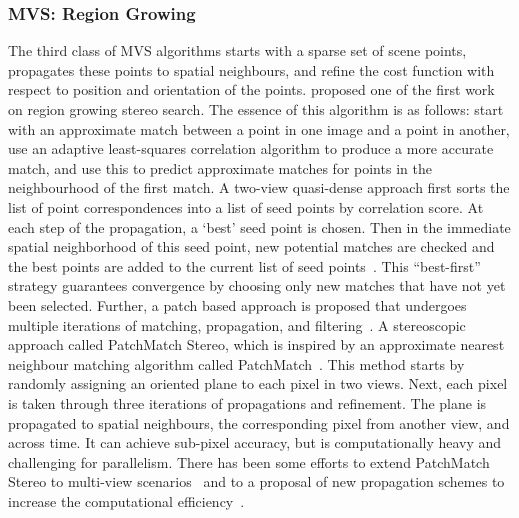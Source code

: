 \subsubsection{MVS: Region Growing}
The third class of MVS algorithms starts with a sparse set of scene points, propagates these points to spatial neighbours, and refine the cost function with respect to position and orientation of the points. \citeauthor{otto1989region} proposed one of the first work on region growing stereo search. The essence of this algorithm is as follows: start with an approximate match between a point in one image and a point in another, use an adaptive least-squares correlation algorithm to produce a more accurate match, and use this to predict approximate matches for points in the neighbourhood of the first match. A two-view quasi-dense approach first sorts the list of point correspondences into a list of seed points by correlation score. At each step of the propagation, a `best' seed point is chosen. Then in the immediate spatial neighborhood of this seed point, new potential matches are checked and the best points are added to the current list of seed points~\cite{lhuillier2002match,lhuillier2005quasi}. This ``best-first'' strategy guarantees convergence by choosing only new matches that have not yet been selected. Further, a patch based approach is proposed that undergoes multiple iterations of matching, propagation, and filtering~\cite{furukawa2010accurate}. A stereoscopic approach called PatchMatch Stereo, which is inspired by an approximate nearest neighbour matching algorithm called PatchMatch~\cite{Barnes:2009:PAR}. This method starts by randomly assigning an oriented plane to each pixel in two views. Next, each pixel is taken through three iterations of propagations and refinement. The plane is propagated to spatial neighbours, the corresponding pixel from another view, and across time. It can achieve sub-pixel accuracy, but is computationally heavy and challenging for parallelism. There has been some efforts to extend PatchMatch Stereo to multi-view scenarios~\cite{galliani2015massively,uh2014efficient,zheng2014patchmatch} and to a proposal of new propagation schemes to increase the computational efficiency~\cite{galliani2015massively}.

